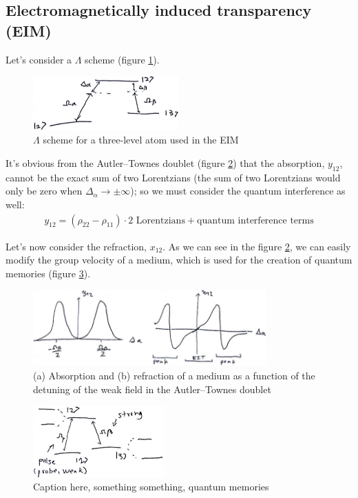 \subsection[Electromagnetically induced transparency]{Electromagnetically induced transparency (EIM)}
Let's consider a $\Lambda$ scheme (figure \ref{fig:lambda-scheme-eim1}).
\begin{figure}[H]
	\centering
	\includegraphics[width=0.5\textwidth]{./images/3-lambda-scheme-eim1}
	\caption{$\Lambda$ scheme for a three-level atom used in the EIM}
	\label{fig:lambda-scheme-eim1}
\end{figure}
It's obvious from the Autler--Townes doublet (figure \ref{fig:eim-abs-disp}) that the absorption, $y_{12}$, cannot be the exact sum of two Lorentzians (the sum of two Lorentzians would only be zero when $\Delta_{\alpha} \to \pm \infty$); so we must consider the quantum interference as well:
\begin{align*}
	y_{12} = (\rho_{22} - \rho_{11}) \cdot 2\text{ Lorentzians} + \text{quantum interference terms}
\end{align*}

Let's now consider the refraction, $x_{12}$. As we can see in the figure \ref{fig:eim-abs-disp}, we can easily modify the group velocity of a medium, which is used for the creation of quantum memories (figure \ref{fig:lambda-scheme-eim2}).
\begin{figure}[H]
	\centering
	\includegraphics[width=0.8\textwidth]{./images/3-eim-abs-disp}
	\caption{(a) Absorption and (b) refraction of a medium as a function of the detuning of the weak field in the Autler--Townes doublet}
	\label{fig:eim-abs-disp}
\end{figure}

\begin{figure}[H]
	\centering
	\includegraphics[width=0.45\textwidth]{./images/3-lambda-scheme-eim2}
	\caption{Caption here, something something, quantum memories}
	\label{fig:lambda-scheme-eim2}
\end{figure}

